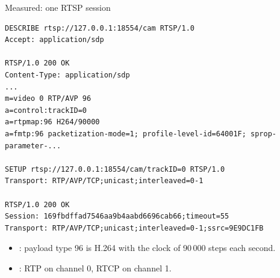 \begin{frame}[fragile]{Measured: one RTSP session}
\begin{lstlisting}[style=shell, basicstyle=\ttfamily\scriptsize]
DESCRIBE rtsp://127.0.0.1:18554/cam RTSP/1.0
Accept: application/sdp

RTSP/1.0 200 OK
Content-Type: application/sdp
...
m=video 0 RTP/AVP 96
a=control:trackID=0
a=rtpmap:96 H264/90000
a=fmtp:96 packetization-mode=1; profile-level-id=64001F; sprop-parameter-...

SETUP rtsp://127.0.0.1:18554/cam/trackID=0 RTSP/1.0
Transport: RTP/AVP/TCP;unicast;interleaved=0-1

RTSP/1.0 200 OK
Session: 169fbdffad7546aa9b4aabd6696cab66;timeout=55
Transport: RTP/AVP/TCP;unicast;interleaved=0-1;ssrc=9E9DC1FB
\end{lstlisting}
  \small
  \begin{itemize}
    \item {}: payload type 96 is H.264 with the
          clock of 90\,000 steps each second.
    \item {}: RTP on channel 0, RTCP on channel 1.
  \end{itemize}
\end{frame}

